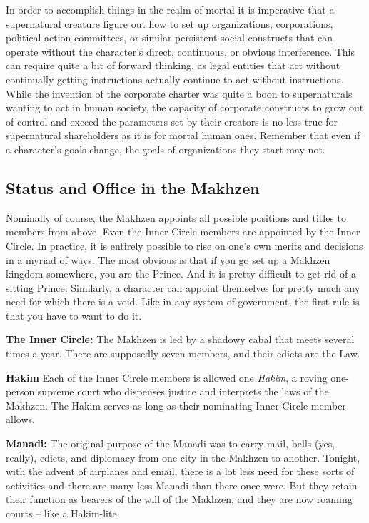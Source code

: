 In order to accomplish things in the realm of mortal it is imperative that a supernatural creature figure out how to set up organizations, corporations, political action committees, or similar persistent social constructs that can operate without the character's direct, continuous, or obvious interference. This can require quite a bit of forward thinking, as legal entities that act without continually getting instructions actually continue to act without instructions. While the invention of the corporate charter was quite a boon to supernaturals wanting to act in human society, the capacity of corporate constructs to grow out of control and exceed the parameters set by their creators is no less true for supernatural shareholders as it is for mortal human ones. Remember that even if a character's goals change, the goals of organizations they start may not.

\subsection{Status and Office in the Makhzen} 

Nominally of course, the Makhzen appoints all possible positions and titles to members from above. Even the Inner Circle members are appointed by the Inner Circle. In practice, it is entirely possible to rise on one's own merits and decisions in a myriad of ways. The most obvious is that if you go set up a Makhzen kingdom somewhere, you are the Prince. And it is pretty difficult to get rid of a sitting Prince. Similarly, a character can appoint themselves for pretty much any need for which there is a void. Like in any system of government, the first rule is that you have to want to do it.

\textbf{The Inner Circle:} The Makhzen is led by a shadowy cabal that meets several times a year. There are supposedly seven members, and their edicts are the Law.

\textbf{Hakim} Each of the Inner Circle members is allowed one \textit{Hakim}, a roving one-person supreme court who dispenses justice and interprets the laws of the Makhzen. The Hakim serves as long as their nominating Inner Circle member allows.

\textbf{Manadi:} The original purpose of the Manadi was to carry mail, bells (yes, really), edicts, and diplomacy from one city in the Makhzen to another. Tonight, with the advent of airplanes and email, there is a lot less need for these sorts of activities and there are many less Manadi than there once were. But they retain their function as bearers of the will of the Makhzen, and they are now roaming courts -- like a Hakim-lite.

